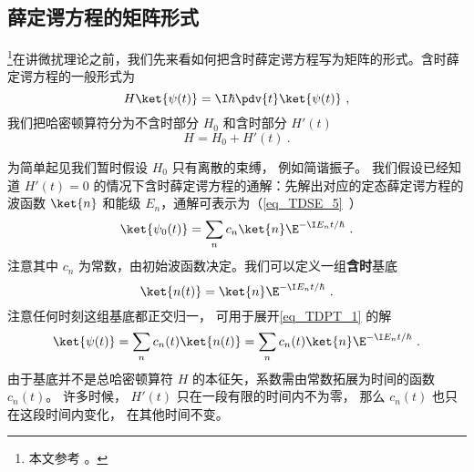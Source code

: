 

\subsection{薛定谔方程的矩阵形式}
\footnote{本文参考 \cite{GriffQ}。}在讲微扰理论之前，我们先来看如何把含时薛定谔方程写为矩阵的形式。含时薛定谔方程的一般形式为
\begin{equation}\label{eq_TDPT_1}
H \ket{\psi(t)} = \I\hbar \pdv{t} \ket{\psi(t)}~,
\end{equation}
我们把哈密顿算符分为不含时部分 $H_0$ 和含时部分 $H'(t)$
\begin{equation}
H = H_0 + H'(t)~.
\end{equation}

为简单起见我们暂时假设 $H_0$ 只有离散的束缚， 例如简谐振子。 我们假设已经知道 $H'(t) = 0$ 的情况下含时薛定谔方程的通解：先解出对应的定态薛定谔方程的波函数 $\ket{n}$ 和能级 $E_n$，通解可表示为（\autoref{eq_TDSE_5}~）
\begin{equation}
\ket{\psi_0(t)} = \sum_n c_n \ket{n} \E^{-\I E_n t/\hbar}~.
\end{equation}
注意其中 $c_n$ 为常数，由初始波函数决定。我们可以定义一组\textbf{含时}基底
\begin{equation}
\ket{n(t)} = \ket{n} \E^{-\I E_n t/\hbar}~.
\end{equation}
注意任何时刻这组基底都正交归一， 可用于展开\autoref{eq_TDPT_1} 的解
\begin{equation}
\ket{\psi(t)} = \sum_n c_n(t) \ket{n(t)} = \sum_n c_n(t) \ket{n} \E^{-\I E_n t/\hbar}~.
\end{equation}
由于基底并不是总哈密顿算符 $H$ 的本征矢，系数需由常数拓展为时间的函数 $c_n(t)$。 许多时候， $H'(t)$ 只在一段有限的时间内不为零， 那么 $c_n(t)$ 也只在这段时间内变化， 在其他时间不变。

